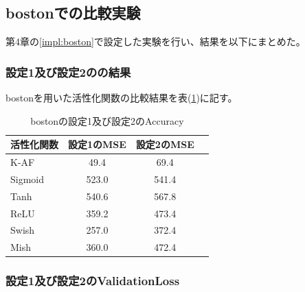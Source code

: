\subsection{bostonでの比較実験}
\label{ev:bostonでの比較実験}

第4章の\ref{impl:boston}で設定した実験を行い、結果を以下にまとめた。
\subsubsection{設定1及び設定2のの結果}

bostonを用いた活性化関数の比較結果を表(\ref{result:bostontable})に記す。


\begin{table}[htbp]
    \begin{center}
        \caption{bostonの設定1及び設定2のAccuracy}
        \label{result:bostontable}
        \vspace{2mm} 
        \begin{tabular}{l*{2}{c}r}
            活性化関数              & 設定1のMSE &  設定2のMSE \\
            \hline
            K-AF            & 49.4 & 69.4 \\
            Sigmoid            & 523.0 & 541.4 \\
            Tanh            & 540.6 &  567.8 \\
            ReLU        & 359.2 & 473.4 \\
            Swish           & 257.0 & 372.4 \\
            Mish           & 360.0 & 472.4 \\
    
        \end{tabular}
    \end{center}
\end{table}


\subsubsection{設定1及び設定2のValidationLoss}
\label{boston:loss}

